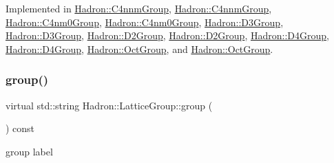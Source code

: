 Implemented in \mbox{\hyperlink{structHadron_1_1C4nnmGroup_a9f35739dbd3ad6effd0e675d40b5341d}{Hadron\+::\+C4nnm\+Group}}, \mbox{\hyperlink{structHadron_1_1C4nnmGroup_a9f35739dbd3ad6effd0e675d40b5341d}{Hadron\+::\+C4nnm\+Group}}, \mbox{\hyperlink{structHadron_1_1C4nm0Group_a2a84060776245ed0045a7271b00064eb}{Hadron\+::\+C4nm0\+Group}}, \mbox{\hyperlink{structHadron_1_1C4nm0Group_a2a84060776245ed0045a7271b00064eb}{Hadron\+::\+C4nm0\+Group}}, \mbox{\hyperlink{structHadron_1_1D3Group_a60e24b1e2d17481b7ab94860c95ce155}{Hadron\+::\+D3\+Group}}, \mbox{\hyperlink{structHadron_1_1D3Group_a60e24b1e2d17481b7ab94860c95ce155}{Hadron\+::\+D3\+Group}}, \mbox{\hyperlink{structHadron_1_1D2Group_aa6d99edf22f99550602f38437aadd890}{Hadron\+::\+D2\+Group}}, \mbox{\hyperlink{structHadron_1_1D2Group_aa6d99edf22f99550602f38437aadd890}{Hadron\+::\+D2\+Group}}, \mbox{\hyperlink{structHadron_1_1D4Group_ae6c08a58023532bcf277f60c1dddde4f}{Hadron\+::\+D4\+Group}}, \mbox{\hyperlink{structHadron_1_1D4Group_ae6c08a58023532bcf277f60c1dddde4f}{Hadron\+::\+D4\+Group}}, \mbox{\hyperlink{structHadron_1_1OctGroup_a0d21b9bbc5cc2cafa4945e9dd5608a6b}{Hadron\+::\+Oct\+Group}}, and \mbox{\hyperlink{structHadron_1_1OctGroup_a0d21b9bbc5cc2cafa4945e9dd5608a6b}{Hadron\+::\+Oct\+Group}}.

\mbox{\label{structHadron_1_1LatticeGroup_a82208a322bf1b1db489f16af38e70087}} 
\subsubsection{\texorpdfstring{group()}{group()}\hspace{0.1cm}{\footnotesize\ttfamily [2/2]}}
{\footnotesize\ttfamily virtual std\+::string Hadron\+::\+Lattice\+Group\+::group (\begin{DoxyParamCaption}{ }\end{DoxyParamCaption}) const\hspace{0.3cm}{\ttfamily [pure virtual]}}

group label 

